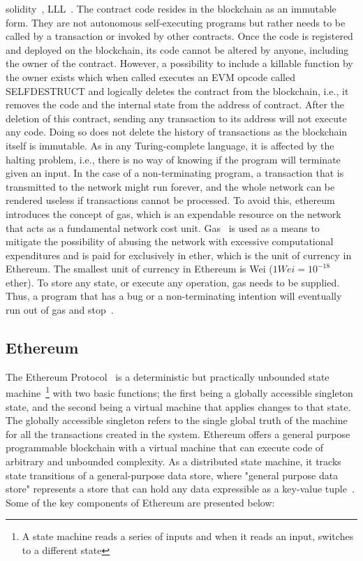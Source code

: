 solidity~\cite{SolidityDocs}, LLL~\cite{LLL}. The contract code resides in the
blockchain as an immutable form. They are not autonomous self-executing
programs but rather needs to be called by a transaction or invoked by other
contracts. Once the code is registered and deployed on the blockchain, its code
cannot be altered by anyone, including the owner of the contract. However, a
possibility to include a killable function by the owner exists which when
called executes an EVM opcode called SELFDESTRUCT and logically deletes the
contract from the blockchain, i.e., it removes the code and the internal state
from the address of contract. After the deletion of this contract, sending any
transaction to its address will not execute any code. Doing so does not delete
the history of transactions as the blockchain itself is immutable.  As in any
Turing-complete language, it is affected by the halting problem, i.e., there is
no way of knowing if the program will terminate given an input.  In the case of
a non-terminating program, a transaction that is transmitted to the network
might run forever, and the whole network can be rendered useless if
transactions cannot be processed. To avoid this, ethereum introduces the
concept of gas, which is an expendable resource on the network that acts as a
fundamental network cost unit. Gas~\cite{ethereumbiegepaper} is used as a means
to mitigate the possibility of abusing the network with excessive computational
expenditures and is paid for exclusively in ether, which is the unit of
currency in Ethereum. The smallest unit of currency in Ethereum is Wei ($1 Wei
= 10^{-18}$ ether). To store any state, or execute any operation, gas needs to
be supplied. Thus, a program that has a bug or a non-terminating intention will
eventually run out of gas and stop~\cite{whataresmartcontracts}. 
\subsection{Ethereum} \label{subsec:ethereum}
The Ethereum Protocol~\cite{ethereumbiegepaper} is a deterministic but
practically unbounded state machine~\footnote{A state machine reads a series of
inputs and when it reads an input, switches to a different state} with two
basic functions; the first being a globally accessible singleton state, and the
second being a virtual machine that applies changes to that state. The globally
accessible singleton refers to the single global truth of the machine for all
the transactions created in the system. Ethereum offers a general purpose
programmable blockchain with a virtual machine that can execute code of
arbitrary and unbounded complexity. As a distributed state machine, it tracks
state transitions of a general-purpose data store, where "general purpose data
store" represents a store that can hold any data expressible as a key-value
tuple~\cite{MasteringEthereum}. Some of the key components of Ethereum are
presented below:  
